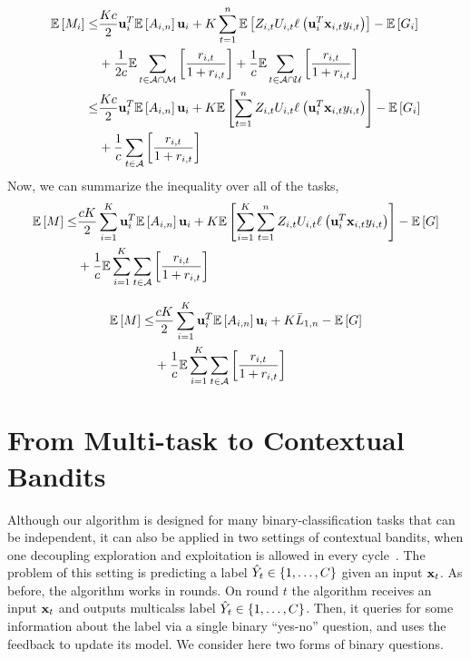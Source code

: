 \begin{equation*}
\begin{split}
\mathbb{E}\left[{M_{i}}\right]\le&\frac{Kc}{2} \mathbf{u}_i^T \mathbb{E}\left[{A_{i,n}}\right] \mathbf{u}_i+K\sum_{t=1}^{n}\mathbb{E}\left[{{Z_{i,t}U_{i,t}\ell_{}\left({\mathbf{u}_i^T\mathbf{x}_{i,t}y_{i,t}}\right)}}\right] -\mathbb{E}\left[{G_{i}}\right]\\
&+\frac{1}{2c}\mathbb{E}\sum_{t\in\mathcal{A\cap M}}\left[{\frac{r_{i,t}}{1+r_{i,t}}}\right]
+\frac{1}{c}\mathbb{E}\sum_{t\in\mathcal{A\cap U}}\left[{\frac{r_{i,t}}{1+r_{i,t}}}\right]\\
\le& \frac{Kc}{2} \mathbf{u}_i^T \mathbb{E}\left[{A_{i,n}}\right] \mathbf{u}_i+K\mathbb{E}\left[{\sum_{t=1}^{n}{Z_{i,t}U_{i,t}\ell_{}\left({\mathbf{u}_i^T\mathbf{x}_{i,t}y_{i,t}}\right)}}\right]-\mathbb{E}\left[{G_{i}}\right]\\
&+\frac{1}{c}\sum_{t\in\mathcal{A}}\left[{\frac{r_{i,t}}{1+r_{i,t}}}\right]
\end{split}
\end{equation*}
Now, we can summarize the inequality over all of the tasks,
\begin{equation*}
\begin{split}
\mathbb{E}\left[{M}\right]\le &\frac{cK}{2}\sum_{i=1}^{K}  \mathbf{u}_i^T \mathbb{E}\left[{A_{i,n}}\right] \mathbf{u}_i+K\mathbb{E}\left[{\sum_{i=1}^{K}\sum_{t=1}^{n}Z_{i,t}U_{i,t}{\ell_{}\left({\mathbf{u}_i^T\mathbf{x}_{i,t}y_{i,t}}\right)}}\right]-\mathbb{E}\left[{G}\right]\\
&+\frac{1}{c}\mathbb{E}\sum_{i=1}^{K}\sum_{t\in\mathcal{A}}\left[{\frac{r_{i,t}}{1+r_{i,t}}}\right]
\end{split}
\end{equation*}
 
\begin{equation*}
\begin{split}
\mathbb{E}\left[{M}\right]\le &\frac{cK}{2}\sum_{i=1}^{K}  \mathbf{u}_i^T \mathbb{E}\left[{A_{i,n}}\right] \mathbf{u}_i+K{\bar L}_{1,n}-\mathbb{E}\left[{G}\right]\\
&+\frac{1}{c}\mathbb{E}\sum_{i=1}^{K}\sum_{t\in\mathcal{A}}\left[{\frac{r_{i,t}}{1+r_{i,t}}}\right]
\end{split}
\end{equation*} 
 \section{From Multi-task to Contextual Bandits}
Although our algorithm is designed for many binary-classification tasks that can be independent, it can also be applied in two settings of contextual bandits, when one decoupling exploration and exploitation is allowed in every cycle~\cite{DBLP:conf/icml/YuM09,DBLP:conf/icml/AvnerMS12}. The problem of this setting is predicting a label $\hat{Y}_t \in\{ 1 , \ldots , C\}$ given an input $\mathbf{x}_{t}$. As before, the algorithm works in rounds. On round $t$ the algorithm receives an input $\mathbf{x}_{t}$ and outputs  multicalss label $\hat{Y}_t\in\{1 , \ldots , C\}$. Then, it queries for some information about the label via a single binary ``yes-no'' question, and uses the feedback to update its model. We consider here two forms of binary questions.

